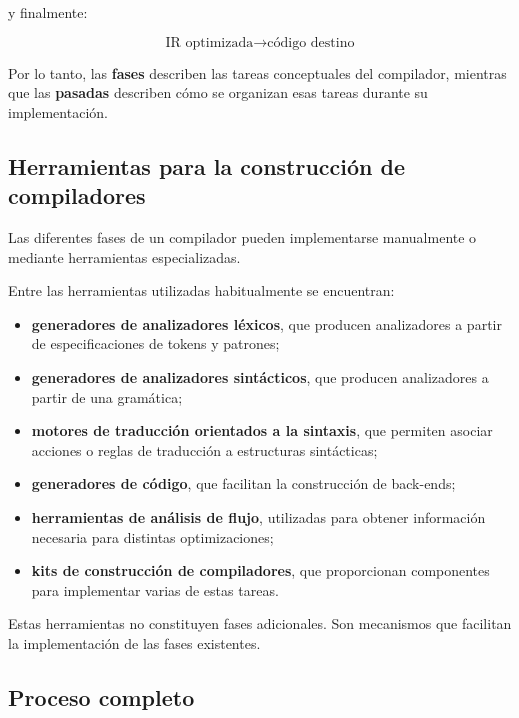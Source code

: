 \documentclass[11pt,a4paper]{article}
\begin{document}
y finalmente:

\[
\text{IR optimizada}
\rightarrow
\text{código destino}
\]

Por lo tanto, las \textbf{fases} describen las tareas conceptuales del
compilador, mientras que las \textbf{pasadas} describen cómo se organizan
esas tareas durante su implementación.

\subsection{Herramientas para la construcción de compiladores}

Las diferentes fases de un compilador pueden implementarse manualmente o
mediante herramientas especializadas.

Entre las herramientas utilizadas habitualmente se encuentran:

\begin{itemize}
    \item \textbf{generadores de analizadores léxicos}, que producen
    analizadores a partir de especificaciones de tokens y patrones;

    \item \textbf{generadores de analizadores sintácticos}, que producen
    analizadores a partir de una gramática;

    \item \textbf{motores de traducción orientados a la sintaxis}, que
    permiten asociar acciones o reglas de traducción a estructuras
    sintácticas;

    \item \textbf{generadores de código}, que facilitan la construcción de
    back-ends;

    \item \textbf{herramientas de análisis de flujo}, utilizadas para
    obtener información necesaria para distintas optimizaciones;

    \item \textbf{kits de construcción de compiladores}, que proporcionan
    componentes para implementar varias de estas tareas.
\end{itemize}

Estas herramientas no constituyen fases adicionales. Son mecanismos que
facilitan la implementación de las fases existentes.

\subsection{Proceso completo}
\end{document}
